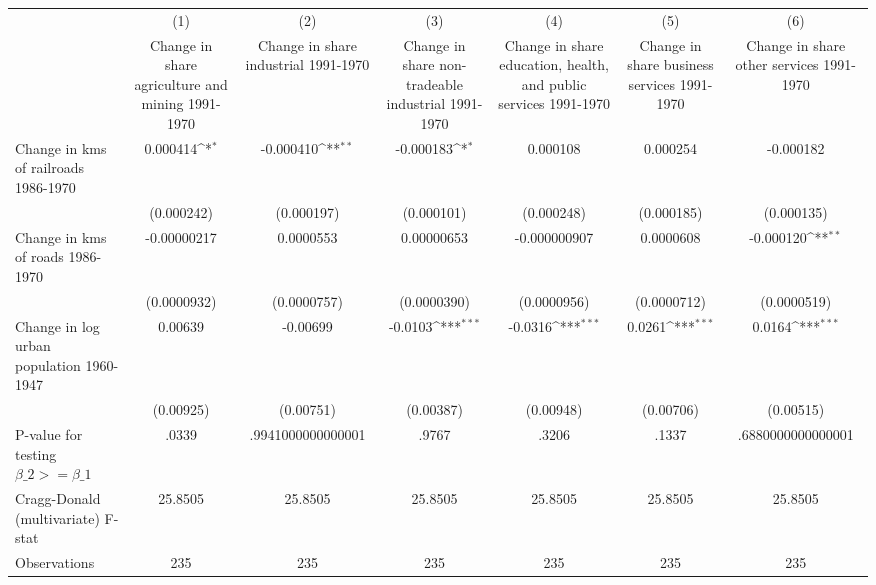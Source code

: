{
\def\sym#1{\ifmmode^{#1}\else\(^{#1}\)\fi}
\begin{tabular}{l*{6}{c}}
\hline\hline
                &\multicolumn{1}{c}{(1)}&\multicolumn{1}{c}{(2)}&\multicolumn{1}{c}{(3)}&\multicolumn{1}{c}{(4)}&\multicolumn{1}{c}{(5)}&\multicolumn{1}{c}{(6)}\\
                &\multicolumn{1}{c}{Change in share agriculture and mining 1991-1970}&\multicolumn{1}{c}{Change in share industrial 1991-1970}&\multicolumn{1}{c}{Change in share non-tradeable industrial 1991-1970}&\multicolumn{1}{c}{Change in share education, health, and public services 1991-1970}&\multicolumn{1}{c}{Change in share business services 1991-1970}&\multicolumn{1}{c}{Change in share other services 1991-1970}\\
\hline
Change in kms of railroads 1986-1970& 0.000414\sym{*}  &-0.000410\sym{**} &-0.000183\sym{*}  & 0.000108         & 0.000254         &-0.000182         \\
                &(0.000242)         &(0.000197)         &(0.000101)         &(0.000248)         &(0.000185)         &(0.000135)         \\
[1em]
Change in kms of roads 1986-1970&-0.00000217         &0.0000553         &0.00000653         &-0.000000907         &0.0000608         &-0.000120\sym{**} \\
                &(0.0000932)         &(0.0000757)         &(0.0000390)         &(0.0000956)         &(0.0000712)         &(0.0000519)         \\
[1em]
Change in log urban population 1960-1947&  0.00639         & -0.00699         &  -0.0103\sym{***}&  -0.0316\sym{***}&   0.0261\sym{***}&   0.0164\sym{***}\\
                &(0.00925)         &(0.00751)         &(0.00387)         &(0.00948)         &(0.00706)         &(0.00515)         \\
\hline
P-value for testing $\beta\_{2} >= \beta\_{1}$&    .0339         &.9941000000000001         &    .9767         &    .3206         &    .1337         &.6880000000000001         \\
Cragg-Donald (multivariate) F-stat&  25.8505         &  25.8505         &  25.8505         &  25.8505         &  25.8505         &  25.8505         \\
Observations    &      235         &      235         &      235         &      235         &      235         &      235         \\
\hline\hline
\end{tabular}
}
